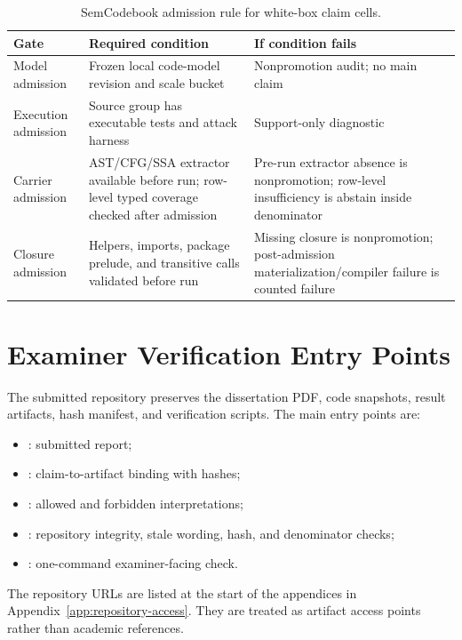 \begin{table}[htbp]
\centering
\caption{SemCodebook admission rule for white-box claim cells.}
\label{tab:sem-admission-app}
\tighttable
\begin{tabularx}{\textwidth}{@{}L{2.25cm}YY@{}}
\toprule
Gate & Required condition & If condition fails \\
\midrule
Model admission & Frozen local code-model revision and scale bucket & Nonpromotion audit; no main claim \\
Execution admission & Source group has executable tests and attack harness & Support-only diagnostic \\
Carrier admission & AST/CFG/SSA extractor available before run; row-level typed coverage checked after admission & Pre-run extractor absence is nonpromotion; row-level insufficiency is abstain inside denominator \\
Closure admission & Helpers, imports, package prelude, and transitive calls validated before run & Missing closure is nonpromotion; post-admission materialization/compiler failure is counted failure \\
\bottomrule
\end{tabularx}
\end{table}

\section{Examiner Verification Entry Points}

The submitted repository preserves the dissertation PDF, code snapshots, result artifacts, hash manifest, and verification scripts. The main entry points are:
\begin{itemize}
  \item {}: submitted report;
  \item {}: claim-to-artifact binding with hashes;
  \item {}: allowed and forbidden interpretations;
  \item {}: repository integrity, stale wording, hash, and denominator checks;
  \item {}: one-command examiner-facing check.
\end{itemize}

The repository URLs are listed at the start of the appendices in
Appendix~\ref{app:repository-access}. They are treated as artifact access
points rather than academic references.

